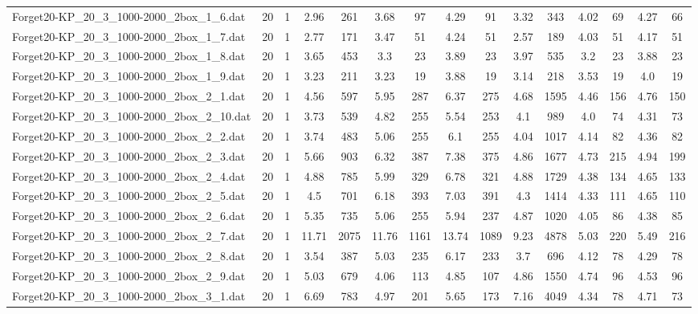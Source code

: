 \begin{table}[!ht]
{\begin{tabular}{lcccccccccccccc}
Forget20-KP\_20\_3\_1000-2000\_2box\_1\_6.dat & 20 & 1 & 2.96 & 261 & 3.68 & 97 & 4.29 & 91 & 3.32 & 343 & 4.02 & 69 & 4.27 & 66 \\
Forget20-KP\_20\_3\_1000-2000\_2box\_1\_7.dat & 20 & 1 & 2.77 & 171 & 3.47 & 51 & 4.24 & 51 & 2.57 & 189 & 4.03 & 51 & 4.17 & 51 \\
Forget20-KP\_20\_3\_1000-2000\_2box\_1\_8.dat & 20 & 1 & 3.65 & 453 & 3.3 & 23 & 3.89 & 23 & 3.97 & 535 & 3.2 & 23 & 3.88 & 23 \\
Forget20-KP\_20\_3\_1000-2000\_2box\_1\_9.dat & 20 & 1 & 3.23 & 211 & 3.23 & 19 & 3.88 & 19 & 3.14 & 218 & 3.53 & 19 & 4.0 & 19 \\
Forget20-KP\_20\_3\_1000-2000\_2box\_2\_1.dat & 20 & 1 & 4.56 & 597 & 5.95 & 287 & 6.37 & 275 & 4.68 & 1595 & 4.46 & 156 & 4.76 & 150 \\
Forget20-KP\_20\_3\_1000-2000\_2box\_2\_10.dat & 20 & 1 & 3.73 & 539 & 4.82 & 255 & 5.54 & 253 & 4.1 & 989 & 4.0 & 74 & 4.31 & 73 \\
Forget20-KP\_20\_3\_1000-2000\_2box\_2\_2.dat & 20 & 1 & 3.74 & 483 & 5.06 & 255 & 6.1 & 255 & 4.04 & 1017 & 4.14 & 82 & 4.36 & 82 \\
Forget20-KP\_20\_3\_1000-2000\_2box\_2\_3.dat & 20 & 1 & 5.66 & 903 & 6.32 & 387 & 7.38 & 375 & 4.86 & 1677 & 4.73 & 215 & 4.94 & 199 \\
Forget20-KP\_20\_3\_1000-2000\_2box\_2\_4.dat & 20 & 1 & 4.88 & 785 & 5.99 & 329 & 6.78 & 321 & 4.88 & 1729 & 4.38 & 134 & 4.65 & 133 \\
Forget20-KP\_20\_3\_1000-2000\_2box\_2\_5.dat & 20 & 1 & 4.5 & 701 & 6.18 & 393 & 7.03 & 391 & 4.3 & 1414 & 4.33 & 111 & 4.65 & 110 \\
Forget20-KP\_20\_3\_1000-2000\_2box\_2\_6.dat & 20 & 1 & 5.35 & 735 & 5.06 & 255 & 5.94 & 237 & 4.87 & 1020 & 4.05 & 86 & 4.38 & 85 \\
Forget20-KP\_20\_3\_1000-2000\_2box\_2\_7.dat & 20 & 1 & 11.71 & 2075 & 11.76 & 1161 & 13.74 & 1089 & 9.23 & 4878 & 5.03 & 220 & 5.49 & 216 \\
Forget20-KP\_20\_3\_1000-2000\_2box\_2\_8.dat & 20 & 1 & 3.54 & 387 & 5.03 & 235 & 6.17 & 233 & 3.7 & 696 & 4.12 & 78 & 4.29 & 78 \\
Forget20-KP\_20\_3\_1000-2000\_2box\_2\_9.dat & 20 & 1 & 5.03 & 679 & 4.06 & 113 & 4.85 & 107 & 4.86 & 1550 & 4.74 & 96 & 4.53 & 96 \\
Forget20-KP\_20\_3\_1000-2000\_2box\_3\_1.dat & 20 & 1 & 6.69 & 783 & 4.97 & 201 & 5.65 & 173 & 7.16 & 4049 & 4.34 & 78 & 4.71 & 73 \\

\end{tabular}}
\end{table}
